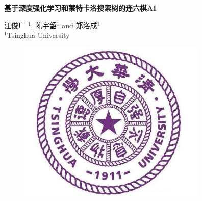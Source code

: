 \documentclass[portrait]{a0poster}	%
\begin{document}

\begin{minipage}{\textwidth}
	\begin{minipage}{.86\textwidth}
		\Huge\textbf{基于深度强化学习和蒙特卡洛搜索树的连六棋AI}\\
		
        \par\huge 江俊广 $^1$, 陈宇韶$^1$ and 郑洛成$^1$\\
        
		\large $^1$Tsinghua University\\ 
	\end{minipage}
	\begin{minipage}[b]{.12\textwidth}
		\begin{figure}[H]
        	\flushright
			\includegraphics[width=9cm]{tsinghua.jpg}
		\end{figure}
	\end{minipage}
\end{minipage}

\vspace{1cm}

\end{document}
